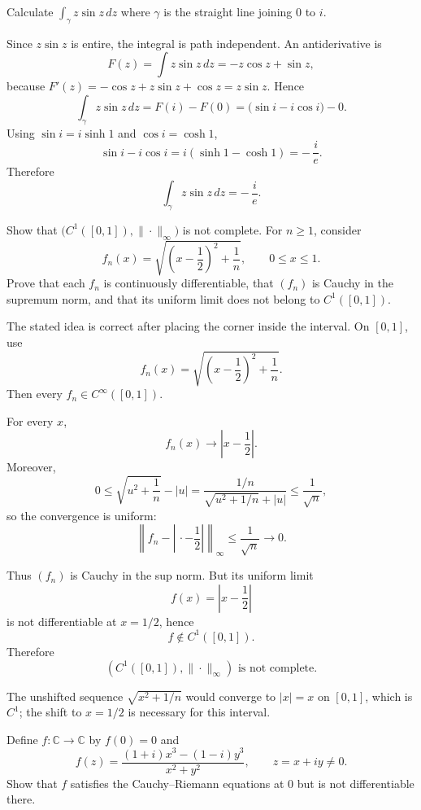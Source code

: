 \begin{problem}[CP-IV-0074]
\label{prob:cp-iv-0074}
Calculate $\displaystyle \int_{\gamma} z\sin z\,dz$ where $\gamma$ is the straight line joining $0$ to $i$.
\end{problem}

\begin{solution}
Since $z\sin z$ is entire, the integral is path independent. An antiderivative is
\[
F(z)=\int z\sin z\,dz=-z\cos z+\sin z,
\]
because $F'(z)=-\cos z+z\sin z+\cos z=z\sin z$. Hence
\[
\int_{\gamma} z\sin z\,dz = F(i)-F(0)
= \big(\sin i - i\cos i\big)-0.
\]
Using $\sin i = i\sinh 1$ and $\cos i=\cosh 1$,
\[
\sin i - i\cos i = i(\sinh 1-\cosh 1) = -\,\frac{i}{e}.
\]
Therefore
\[
\boxed{\displaystyle \int_{\gamma} z\sin z\,dz = -\,\frac{i}{e}.}
\]
\end{solution}

\begin{problem}[CP-IV-0075]
\label{prob:cp-iv-0075}
Show that $\bigl(C^1([0,1]),\|\cdot\|_\infty\bigr)$ is not complete.
For $n\ge1$, consider
\[
 f_n(x)=\sqrt{\left(x-\frac12\right)^2+\frac1n},\qquad 0\le x\le1.
\]
Prove that each $f_n$ is continuously differentiable, that $(f_n)$ is Cauchy
in the supremum norm, and that its uniform limit does not belong to $C^1([0,1])$.
\end{problem}

\begin{solution}
The stated idea is correct after placing the corner inside the interval. On \([0,1]\), use
\[
f_n(x)
=
\sqrt{\left(x-\frac12\right)^2+\frac1n}.
\]
Then every \(f_n\in C^\infty([0,1])\).

For every \(x\),
\[
f_n(x)
\longrightarrow
\left|x-\frac12\right|.
\]
Moreover,
\[
0\le
\sqrt{u^2+\frac1n}-|u|
=
\frac{1/n}
{\sqrt{u^2+1/n}+|u|}
\le
\frac1{\sqrt n},
\]
so the convergence is uniform:
\[
\left\|
f_n-\left|\,\cdot-\frac12\right|
\right\|_\infty
\le
\frac1{\sqrt n}
\longrightarrow0.
\]

Thus \((f_n)\) is Cauchy in the sup norm. But its uniform limit
\[
f(x)=\left|x-\frac12\right|
\]
is not differentiable at \(x=1/2\), hence
\[
f\notin C^1([0,1]).
\]
Therefore
\[
\boxed{
(C^1([0,1]),\|\cdot\|_\infty)
\text{ is not complete}.
}
\]

The unshifted sequence \(\sqrt{x^2+1/n}\) would converge to \(|x|=x\) on \([0,1]\), which is \(C^1\); the shift to \(x=1/2\) is necessary for this interval.
\end{solution}


\begin{problem}[CP-IV-0078]
\label{prob:cp-iv-0078}
Define $f:\mathbb C\to\mathbb C$ by $f(0)=0$ and
\[
f(z)=\frac{(1+i)x^{3}-(1-i)y^{3}}{x^{2}+y^{2}},\qquad z=x+iy\ne0.
\]
Show that $f$ satisfies the Cauchy--Riemann equations at $0$ but is not differentiable there.
\end{problem}

